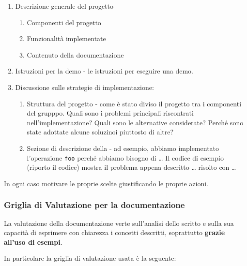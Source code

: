 \documentclass[
]{article}
\providecommand{\tightlist}{%
  \setlength{\itemsep}{0pt}\setlength{\parskip}{0pt}}
\begin{document}
\begin{enumerate}
\def\labelenumi{\arabic{enumi}.}
\tightlist
\item
  Descrizione generale del progetto

  \begin{enumerate}
  \def\labelenumii{\arabic{enumii}.}
  \tightlist
  \item
    Componenti del progetto
  \item
    Funzionalità implementate
  \item
    Contenuto della documentazione
  \end{enumerate}
\item
  Istruzioni per la demo - le istruzioni per eseguire una demo.
\item
  Discussione sulle strategie di implementazione:

  \begin{enumerate}
  \def\labelenumii{\arabic{enumii}.}
  \tightlist
  \item
    Struttura del progetto - come è stato diviso il progetto tra i
    componenti del grupppo. Quali sono i problemi principali riscontrati
    nell'implementazione? Quali sono le alternative considerate? Perché
    sono state adottate alcune soluzinoi piuttosto di altre?
  \item
    Sezione di descrizione della - ad esempio, abbiamo implementato
    l'operazione \texttt{foo} perché abbiamo bisogno di \ldots{} Il
    codice di esempio (riporto il codice) mostra il problema appena
    descritto \ldots{} risolto con \ldots{}
  \end{enumerate}
\end{enumerate}

In ogni caso motivare le proprie scelte giustificando le proprie azioni.

\hypertarget{griglia-di-valutazione-per-la-documentazione}{%
\subsubsection{Griglia di Valutazione per la
documentazione}\label{griglia-di-valutazione-per-la-documentazione}}

La valutazione della documentazione verte sull'analisi dello scritto e
sulla sua capacità di esprimere con chiarezza i concetti descritti,
soprattutto \textbf{grazie all'uso di esempi}.

In particolare la griglia di valutazione usata è la seguente:
\end{document}
